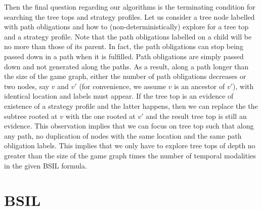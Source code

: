 Then the final question regarding our algorithms is the terminating condition for searching the tree tops and strategy profiles.
Let us consider a tree node labelled with path obligations and how to (non-deterministically) explore for a tree top and a strategy profile.  
Note that the path obligations labelled on a child will be no more than those of its parent.  
In fact, the path obligations can stop being passed down in a path when it is fulfilled. 
Path obligations are simply passed down and not generated along the paths.  
As a result, along a path longer than the size of the game graph, either the number of path obligations decreases or two nodes, say $v$ and $v'$ 
(for convenience, we assume $v$ is an ancestor of $v'$), with identical location and labels must appear.
If the tree top is an evidence of existence of a strategy profile and the latter happens, then we can replace the the subtree rooted at $v$ with the one rooted at 
$v'$ and the result tree top is still an evidence.
This observation implies that we can focus on tree top such that along any path, no duplication of nodes with the same location and the same path obligation labels.  
This implies that we only have to explore tree tops of depth no greater than the size of the game graph times the number of temporal modalities in the given BSIL formula.


\section{BSIL}
